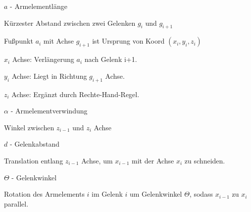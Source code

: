 \begin{itemize}
    \item $a$ - Armelementlänge
    \begin{compactitem}
        \item Kürzester Abstand zwischen zwei Gelenken $g_i$ und $g_{i+1}$
        \item Fußpunkt $a_i$ mit Achse $g_{i+1}$ ist Ursprung von Koord $(x_i,y_i,z_i)$
        \begin{compactitem}
            \item $x_i$ Achse: Verlängerung $a_i$ nach Gelenk i+1.
            \item $y_i$ Achse: Liegt in Richtung $g_{i+1}$ Achse.
            \item $z_i$ Achse: Ergänzt durch Rechte-Hand-Regel.
        \end{compactitem}
    \end{compactitem}
    \item $\alpha$ - Armelementverwindung
    \begin{compactitem}
        \item Winkel zwischen $z_{i-1}$ und $z_i$ Achse
    \end{compactitem}
    \item $d$ - Gelenkabstand
    \begin{compactitem}
        \item Translation entlang $z_{i-1}$ Achse, um $x_{i-1}$ mit der Achse $x_i$ zu schneiden.
    \end{compactitem}
    \item $\Theta$ - Gelenkwinkel
    \begin{compactitem}
        \item Rotation des Armelements $i$ im Gelenk $i$ um Gelenkwinkel $\Theta$, sodass $x_{i-1}$
        zu $x_i$ parallel.
    \end{compactitem}
\end{itemize}

